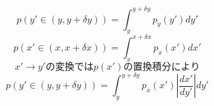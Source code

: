 $$p(y' \in (y, y+\delta y))=\int_{y}^{y+\delta y}{p_y(y')}dy'$$
$$p(x' \in (x, x+\delta x))=\int_{x}^{x+\delta x}{p_x(x')}dx'$$
$$x' \rightarrow y'の変換ではp(x')の置換積分により$$
$$p(y' \in (y, y+\delta y))=\int_{y}^{y+\delta y}{p_x(x')}\left| \frac{dx'}{dy'} \right| dy'$$
